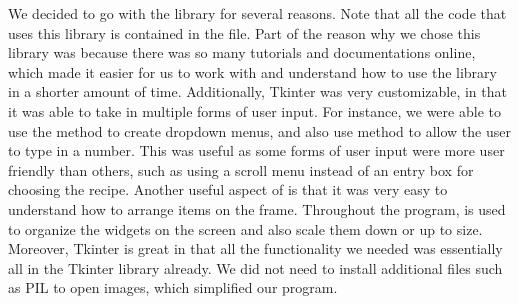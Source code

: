 \documentclass[fontsize=11pt]{article}
\begin{document}
We decided to go with the  library for several reasons. Note that all the code that uses this library is contained in the  file. Part of the reason why we chose this library was because there was so many tutorials and documentations online, which made it easier for us to work with and understand how to use the library in a shorter amount of time. Additionally, Tkinter was very customizable, in that it was able to take in multiple forms of user input. For instance, we were able to use the  method to create dropdown menus, and also use  method to allow the user to type in a number. This was useful as some forms of user input were more user friendly than others, such as using a scroll menu instead of an entry box for choosing the recipe. Another useful aspect of  is that it was very easy to understand how to arrange items on the frame. Throughout the program,  is used to organize the widgets on the screen and also scale them down or up to size. Moreover, Tkinter is great in that all the functionality we needed was essentially all in the Tkinter library already. We did not need to install additional files such as PIL to open images, which simplified our program.
\end{document}
